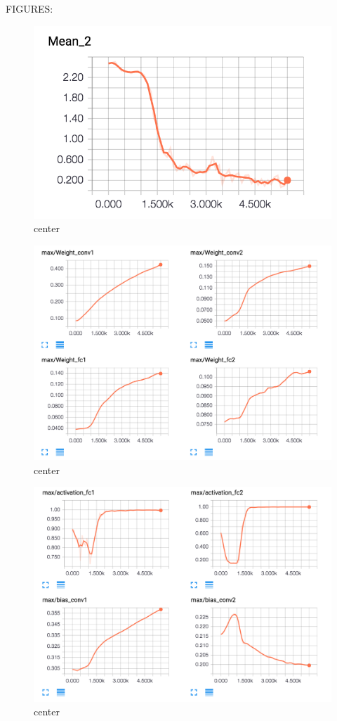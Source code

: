 \documentclass[12pt]{article}
\begin{document}
FIGURES:
\begin{figure}[H]
  \caption{center}
  \centering
    \includegraphics[scale=0.3]{mean2.png}
\end{figure}
\begin{figure}[H]
  \caption{center}
  \centering
    \includegraphics[scale=0.3]{weight.png}
\end{figure}
\begin{figure}[H]
  \caption{center}
  \centering
    \includegraphics[scale=0.3]{w2.png}
\end{figure}
\end{document}
